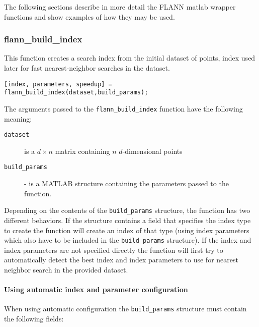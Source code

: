 \documentclass[letter,10pt]{article}
\begin{document}
The following sections describe in more detail the FLANN matlab wrapper
functions and show examples of how they may be used.

\subsubsection{flann\_build\_index}
\label{sec:flann_build_index}

This function creates a search index from the initial dataset of points,
index used  later for fast nearest-neighbor searches in the dataset.

\begin{Verbatim}
[index, parameters, speedup] = flann_build_index(dataset,build_params);
\end{Verbatim}


The arguments passed to the \texttt{flann\_build\_index} function have the
following meaning:
\begin{description}

\item [\texttt{dataset}] is a $d \times n$ matrix containing $n$
$d$-dimensional points

\item [\texttt{build\_params}] - is a MATLAB structure containing the
parameters passed to the function.

\end{description}

Depending on the contents of the \texttt{build\_params} structure, the
function has two different behaviors. If the structure contains a field
that specifies the index type to create the function will create an index
of that type (using index parameters which also have to be included in
the \texttt{build\_params} structure). If the index and index parameters
are not specified directly the function will first try to automatically
detect the best index and index parameters to use for nearest neighbor
search in the provided dataset.

\paragraph{Using automatic index and parameter configuration}
When using automatic configuration the  \texttt{build\_params} structure
must contain the following fields:
\end{document}
